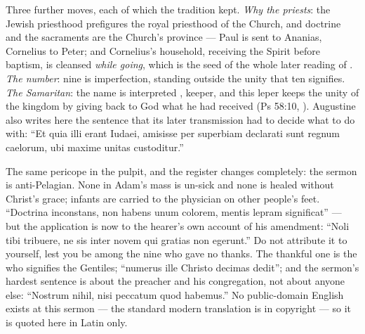\begin{witnessnote}
Three further moves, each of which the tradition kept. \textit{Why the
priests}: the Jewish priesthood prefigures the royal priesthood of the Church,
and doctrine and the sacraments are the Church's province --- Paul is sent to
Ananias, Cornelius to Peter; and Cornelius's household, receiving the Spirit
before baptism, is cleansed \textit{while going}, which is the seed of the
whole later reading of . \textit{The number}: nine is
imperfection, standing outside the unity that ten signifies. \textit{The
Samaritan}: the name is interpreted , keeper, and this leper
keeps the unity of the kingdom by giving back to God what he had received
(Ps 58:10, ). Augustine also writes
here the sentence that its later transmission had to decide what to do with:
``Et quia illi erant Iudaei, amisisse per superbiam declarati sunt regnum
caelorum, ubi maxime unitas custoditur.''
\end{witnessnote}

\begin{witnessnote}
The same pericope in the pulpit, and the register changes completely: the
sermon is anti-Pelagian. None in Adam's mass is un-sick and none is healed
without Christ's grace; infants are carried to the physician on other people's
feet. ``Doctrina inconstans, non habens unum colorem, mentis lepram
significat'' --- but the application is now to the hearer's own account of his
amendment: ``Noli tibi tribuere, ne sis inter novem qui gratias non egerunt.''
Do not attribute it to yourself, lest you be among the nine who gave no
thanks. The thankful one is the  who signifies the Gentiles;
``numerus ille Christo decimas dedit''; and the sermon's hardest sentence is
about the preacher and his congregation, not about anyone else: ``Nostrum
nihil, nisi peccatum quod habemus.'' No public-domain English exists at this
sermon --- the standard modern translation is in copyright --- so it is quoted
here in Latin only.
\end{witnessnote}

